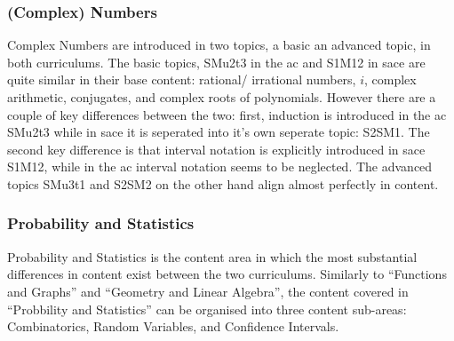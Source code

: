 \documentclass[twoside,12pt,a4paper]{report}
\begin{document}
\subsubsection{(Complex) Numbers}
Complex Numbers are introduced in two topics, a basic an advanced topic, in both curriculums. The basic topics, SMu2t3 in the \gls{ac} and S1M12 in \gls{sace} are quite similar in their base content: rational/ irrational numbers, $i$, complex arithmetic, conjugates, and complex roots of polynomials. However there are a couple of key differences between the two: first, induction is introduced in the \gls{ac} SMu2t3 while in \gls{sace} it is seperated into it's own seperate topic: S2SM1. The second key difference is that interval notation is explicitly introduced in \gls{sace} S1M12, while in the \gls{ac} interval notation seems to be neglected. The advanced topics SMu3t1 and S2SM2 on the other hand align almost perfectly in content.


\subsubsection{Probability and Statistics}
Probability and Statistics is the content area in which the most substantial differences in content exist between the two curriculums. Similarly to ``Functions and Graphs'' and ``Geometry and Linear Algebra'', the content covered in ``Probbility and Statistics'' can be organised into three content sub-areas: Combinatorics, Random Variables, and Confidence Intervals. 
\end{document}
